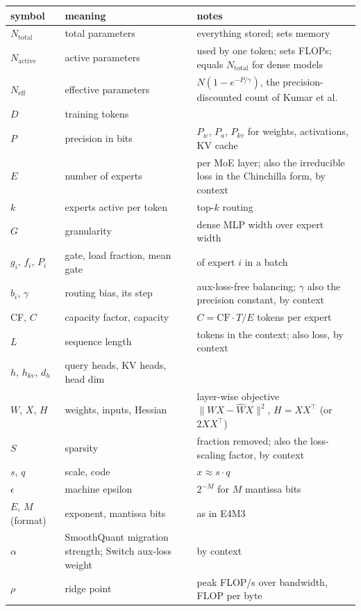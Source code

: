 \documentclass[11pt,letterpaper]{article}
\newcommand{\Nact}{N_{\mathrm{active}}}
\newcommand{\Ntot}{N_{\mathrm{total}}}\newcommand{\Neff}{N_{\mathrm{eff}}}
\begin{document}
\begin{center}\footnotesize\setlength{\tabcolsep}{4pt}
\begin{tabular}{@{}lp{3.4cm}p{7.6cm}@{}}
\toprule
symbol & meaning & notes\\
\midrule
$\Ntot$ & total parameters & everything stored; sets memory\\
$\Nact$ & active parameters & used by one token; sets FLOPs; equals $\Ntot$ for dense models\\
$\Neff$ & effective parameters & $N(1-e^{-P/\gamma})$, the precision-discounted count of Kumar et al.\\
$D$ & training tokens & \\
$P$ & precision in bits & $P_w$, $P_a$, $P_{kv}$ for weights, activations, KV cache\\
$E$ & number of experts & per MoE layer; also the irreducible loss in the Chinchilla form, by context\\
$k$ & experts active per token & top-$k$ routing\\
$G$ & granularity & dense MLP width over expert width\\
$g_i$, $f_i$, $P_i$ & gate, load fraction, mean gate & of expert $i$ in a batch\\
$b_i$, $\gamma$ & routing bias, its step & aux-loss-free balancing; $\gamma$ also the precision constant, by context\\
CF, $C$ & capacity factor, capacity & $C=\text{CF}\cdot T/E$ tokens per expert\\
$L$ & sequence length & tokens in the context; also loss, by context\\
$h$, $h_{kv}$, $d_h$ & query heads, KV heads, head dim & \\
$W$, $X$, $H$ & weights, inputs, Hessian & layer-wise objective $\|WX-\hat WX\|^2$, $H=XX^\top$ (or $2XX^\top$)\\
$S$ & sparsity & fraction removed; also the loss-scaling factor, by context\\
$s$, $q$ & scale, code & $x\approx s\cdot q$\\
$\epsilon$ & machine epsilon & $2^{-M}$ for $M$ mantissa bits\\
$E$, $M$ (format) & exponent, mantissa bits & as in E4M3\\
$\alpha$ & SmoothQuant migration strength; Switch aux-loss weight & by context\\
$\rho$ & ridge point & peak FLOP/s over bandwidth, FLOP per byte\\
\bottomrule
\end{tabular}
\end{center}
\end{document}
